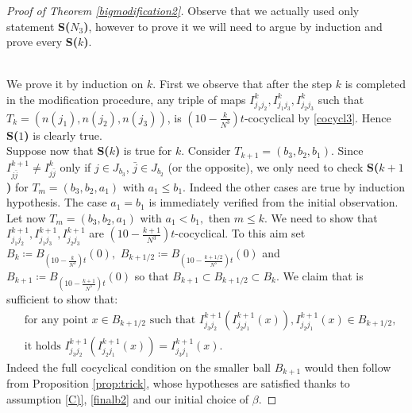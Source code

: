 \documentclass[11pt]{article}
\theoremstyle{plain}
\theoremstyle{definition}
\numberwithin{equation}{section}
\begin{document}
\begin{proof}[Proof of Theorem \ref{bigmodification2}]
	Observe that we actually used only statement {\bf{S($N_3$)}}, however to prove it we will need to argue by induction and prove every 	{\bf{S($k$)}}.
	
	\medskip
	
	\\
	We prove it by induction on $k.$
	First we observe that after the step $k$ is completed in the modification procedure, any triple of maps $I^k_{j_1j_2},I^k_{j_1j_3},I^k_{j_2j_3}$ such that  $T_k=(n(j_1), n(j_2), n(j_3))$, is $(10-\frac{k}{N^3})t$-cocyclical by  \eqref{cocycl3}.
	Hence {\bf{S($1$)}} is clearly true. \\
	Suppose now that {\bf{S($k$)}} is true for $k$. Consider $T_{k+1}=(b_3,b_2,b_1)$. Since  $I^{k+1}_{j\bar j}\neq I^k_{j\bar j}$ only if $j \in J_{b_3}$, $\bar j \in J_{b_2}$ (or the opposite), we only need to check {\bf{S($k+1$)}} for $T_m=(b_3,b_2,a_1)$ with $a_1\le b_1.$ Indeed the other cases are true by induction hypothesis.  The case $a_1=b_1$ is immediately verified from the initial observation. Let now $T_m=(b_3,b_2,a_1)$ with $a_1<b_1,$ then $m\le k.$ We need to show that $I^{k+1}_{j_1j_2},I^{k+1}_{j_1j_3},I^{k+1}_{j_2j_3}$ are $(10-\frac{k+1}{N^3})t$-cocyclical. To this aim set  $B_k\coloneqq B_{(10-\frac{k}{N^3})t}(0),$ $B_{k+1/2}\coloneqq B_{(10-\frac{k+1/2}{N^3})t}(0)$ and $B_{k+1}\coloneqq B_{(10-\frac{k+1}{N^3})t}(0)$ so that $B_{k+1}\subset B_{k+1/2}\subset B_k.$ We claim that is sufficient to show that:
	\begin{equation}\label{cocyclicalfinal}\tag{$\spadesuit$}
		\begin{split}
			&\text{for any point } x \in B_{k+1/2} \text{ such that } I^{k+1}_{j_3j_2}(I^{k+1}_{j_2j_1}(x)),I^{k+1}_{j_2j_1}(x) \in B_{k+1/2}, \\
			&\text{it holds } I^{k+1}_{j_3j_2}(I^{k+1}_{j_2j_1}(x))=I^{k+1}_{j_3j_1}(x).
		\end{split}	
	\end{equation}
	Indeed the full cocyclical condition on the smaller ball $B_{k+1}$ would then follow from Proposition \ref{prop:trick}, whose hypotheses are satisfied thanks to assumption \ref{C)}, \eqref{finalb2} and our initial choice of $\beta$.


\end{proof}
\end{document}
